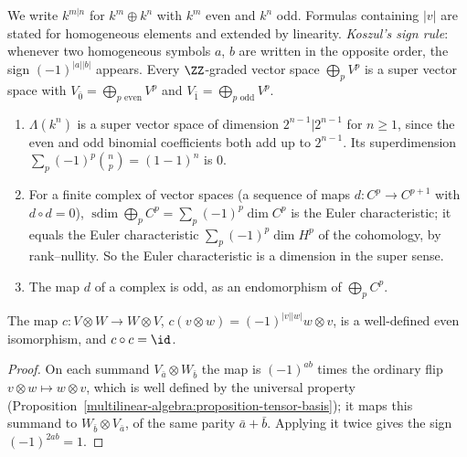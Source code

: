 \begin{notation}\label{multilinear-algebra:notation-super}
We write $k^{m|n}$ for $k^m \oplus k^n$ with $k^m$ even and $k^n$ odd. Formulas containing $|v|$ are stated for homogeneous elements and extended by linearity. \emph{Koszul's sign rule}: whenever two homogeneous
symbols $a$, $b$ are written in the opposite order, the sign $(-1)^{|a||b|}$ appears. Every $\ZZ$-graded vector space $\bigoplus_pV^p$ is a super vector space with $V_{\bar 0} = \bigoplus_{p \text{ even}}V^p$ and
$V_{\bar 1} = \bigoplus_{p \text{ odd}}V^p$.
\end{notation}

\begin{example}\label{multilinear-algebra:example-super-vector-spaces}
\begin{enumerate}
\item $\Lambda(k^n)$ is a super vector space of dimension $2^{n-1}|2^{n-1}$ for $n \geq 1$, since the even and odd binomial coefficients both add up to $2^{n-1}$. Its superdimension
$\sum_p(-1)^p\binom np = (1 - 1)^n$ is $0$.
\item For a finite complex of vector spaces (a sequence of maps $d \colon C^p \to C^{p+1}$ with $d \circ d = 0$), $\operatorname{sdim}\bigoplus_pC^p = \sum_p(-1)^p\dim C^p$ is the Euler characteristic; it equals the
Euler characteristic $\sum_p(-1)^p\dim H^p$ of the cohomology, by rank--nullity. So the Euler characteristic is a dimension in the super sense.
\item The map $d$ of a complex is odd, as an endomorphism of $\bigoplus_pC^p$.
\end{enumerate}
\end{example}

\begin{proposition}\label{multilinear-algebra:proposition-braiding}
The map $c \colon V \otimes W \to W \otimes V$, $c(v \otimes w) = (-1)^{|v||w|}w \otimes v$, is a well-defined even isomorphism, and $c \circ c = \id$.
\end{proposition}

\begin{proof}
On each summand $V_{\bar a} \otimes W_{\bar b}$ the map is $(-1)^{ab}$ times the ordinary flip $v \otimes w \mapsto w \otimes v$, which is well defined by the universal property
(Proposition~\ref{multilinear-algebra:proposition-tensor-basis}); it maps this summand to $W_{\bar b} \otimes V_{\bar a}$, of the same parity $\bar a + \bar b$. Applying it twice gives the sign $(-1)^{2ab} = 1$.
\end{proof}

